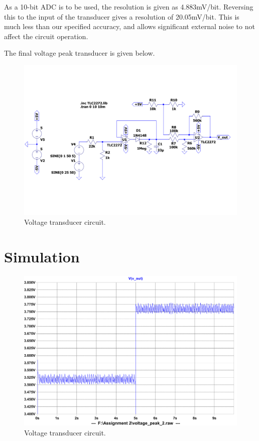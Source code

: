 As a 10-bit ADC is to be used, the resolution is given as 4.883mV/bit. Reversing this to the input of the transducer gives a resolution of 20.05mV/bit. This is much less than our specified accuracy, and allows significant external noise to not affect the circuit operation.

The final voltage peak transducer is given below.
  
  \begin{figure}
        \centering
         \includegraphics[width=1\linewidth]{./Figures/voltage_circuit.pdf}
		    \caption{Voltage transducer circuit.} \label{fig:voltage_circuit}
 \end{figure}

\section{Simulation} \label{sec:simulation_voltage}

\begin{figure}
        \centering
         \includegraphics[width=0.75\linewidth]{./Figures/voltage_transducer_simulation}
		    \caption{Voltage transducer circuit.} \label{fig:voltage_simulate}
 \end{figure}
 

